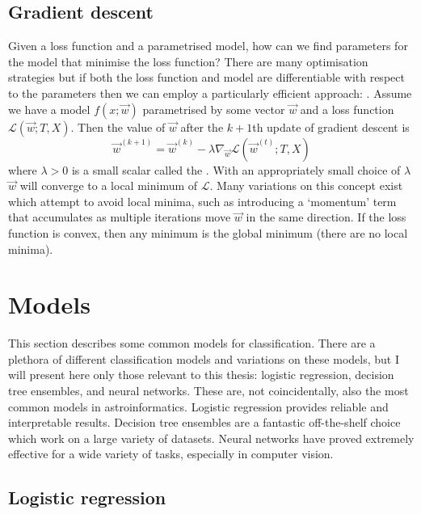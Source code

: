     \subsection{Gradient descent}
    \label{sec:gradient-descent}

        Given a loss function and a parametrised model, how can we find parameters for the model that minimise the loss function? There are many optimisation strategies but if both the loss function and model are differentiable with respect to the parameters then we can employ a particularly efficient approach: . Assume we have a model $f(x; \vec w)$ parametrised by some vector $\vec w$ and a loss function $\mathcal L(\vec w; T, X)$. Then the value of $\vec w$ after the $k + 1$th update of gradient descent is
        \begin{equation}
            \label{eq:gradient-descent}
            \vec w^{(k + 1)} = \vec w^{(k)} - \lambda \nabla_{\vec w} \mathcal L(\vec w^{(t)}; T, X)
        \end{equation}
        where $\lambda > 0$ is a small scalar called the . With an appropriately small choice of $\lambda$ $\vec w$ will converge to a local minimum of $\mathcal L$. Many variations on this concept exist which attempt to avoid local minima, such as introducing a `momentum' term that accumulates as multiple iterations move $\vec w$ in the same direction. If the loss function is convex, then any minimum is the global minimum (there are no local minima).

\section{Models}
\label{sec:models}

    This section describes some common models for classification. There are a plethora of different classification models and variations on these models, but I will present here only those relevant to this thesis: logistic regression, decision tree ensembles, and neural networks. These are, not coincidentally, also the most common models in astroinformatics. Logistic regression provides reliable and interpretable results. Decision tree ensembles are a fantastic off-the-shelf choice which work on a large variety of datasets. Neural networks have proved extremely effective for a wide variety of tasks, especially in computer vision.

    \subsection{Logistic regression}
    \label{sec:logistic-regression}


